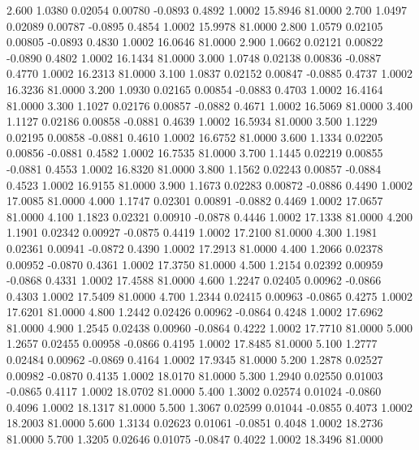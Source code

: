    2.600   1.0380   0.02054   0.00780  -0.0893   0.4892   1.0002  15.8946  81.0000
   2.700   1.0497   0.02089   0.00787  -0.0895   0.4854   1.0002  15.9978  81.0000
   2.800   1.0579   0.02105   0.00805  -0.0893   0.4830   1.0002  16.0646  81.0000
   2.900   1.0662   0.02121   0.00822  -0.0890   0.4802   1.0002  16.1434  81.0000
   3.000   1.0748   0.02138   0.00836  -0.0887   0.4770   1.0002  16.2313  81.0000
   3.100   1.0837   0.02152   0.00847  -0.0885   0.4737   1.0002  16.3236  81.0000
   3.200   1.0930   0.02165   0.00854  -0.0883   0.4703   1.0002  16.4164  81.0000
   3.300   1.1027   0.02176   0.00857  -0.0882   0.4671   1.0002  16.5069  81.0000
   3.400   1.1127   0.02186   0.00858  -0.0881   0.4639   1.0002  16.5934  81.0000
   3.500   1.1229   0.02195   0.00858  -0.0881   0.4610   1.0002  16.6752  81.0000
   3.600   1.1334   0.02205   0.00856  -0.0881   0.4582   1.0002  16.7535  81.0000
   3.700   1.1445   0.02219   0.00855  -0.0881   0.4553   1.0002  16.8320  81.0000
   3.800   1.1562   0.02243   0.00857  -0.0884   0.4523   1.0002  16.9155  81.0000
   3.900   1.1673   0.02283   0.00872  -0.0886   0.4490   1.0002  17.0085  81.0000
   4.000   1.1747   0.02301   0.00891  -0.0882   0.4469   1.0002  17.0657  81.0000
   4.100   1.1823   0.02321   0.00910  -0.0878   0.4446   1.0002  17.1338  81.0000
   4.200   1.1901   0.02342   0.00927  -0.0875   0.4419   1.0002  17.2100  81.0000
   4.300   1.1981   0.02361   0.00941  -0.0872   0.4390   1.0002  17.2913  81.0000
   4.400   1.2066   0.02378   0.00952  -0.0870   0.4361   1.0002  17.3750  81.0000
   4.500   1.2154   0.02392   0.00959  -0.0868   0.4331   1.0002  17.4588  81.0000
   4.600   1.2247   0.02405   0.00962  -0.0866   0.4303   1.0002  17.5409  81.0000
   4.700   1.2344   0.02415   0.00963  -0.0865   0.4275   1.0002  17.6201  81.0000
   4.800   1.2442   0.02426   0.00962  -0.0864   0.4248   1.0002  17.6962  81.0000
   4.900   1.2545   0.02438   0.00960  -0.0864   0.4222   1.0002  17.7710  81.0000
   5.000   1.2657   0.02455   0.00958  -0.0866   0.4195   1.0002  17.8485  81.0000
   5.100   1.2777   0.02484   0.00962  -0.0869   0.4164   1.0002  17.9345  81.0000
   5.200   1.2878   0.02527   0.00982  -0.0870   0.4135   1.0002  18.0170  81.0000
   5.300   1.2940   0.02550   0.01003  -0.0865   0.4117   1.0002  18.0702  81.0000
   5.400   1.3002   0.02574   0.01024  -0.0860   0.4096   1.0002  18.1317  81.0000
   5.500   1.3067   0.02599   0.01044  -0.0855   0.4073   1.0002  18.2003  81.0000
   5.600   1.3134   0.02623   0.01061  -0.0851   0.4048   1.0002  18.2736  81.0000
   5.700   1.3205   0.02646   0.01075  -0.0847   0.4022   1.0002  18.3496  81.0000
